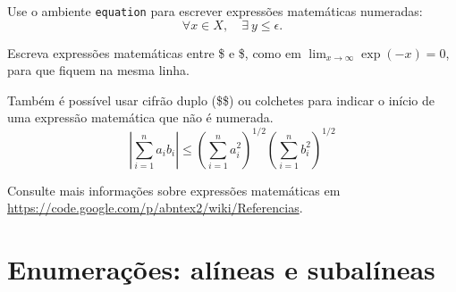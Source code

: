 \documentclass[article,12pt,oneside,a4paper,chapter=TITLE,
			   english,brazil]{abntex2}
\begin{document}
\begin{anexosenv}
Use o ambiente \texttt{equation} para escrever expressões matemáticas numeradas:
\begin{equation}
  \forall x \in X, \quad \exists \: y \leq \epsilon.
\end{equation}

Escreva expressões matemáticas entre \$ e \$, como em $ \lim_{x \to \infty} \exp(-x) = 0 $, para que fiquem na mesma linha.

Também é possível usar cifrão duplo (\$\$) ou colchetes para indicar o início de uma expressão matemática que não é numerada.
$$
\left|\sum_{i=1}^n a_ib_i\right|
\le
\left(\sum_{i=1}^n a_i^2\right)^{1/2}
\left(\sum_{i=1}^n b_i^2\right)^{1/2}
$$

Consulte mais informações sobre expressões matemáticas em \url{https://code.google.com/p/abntex2/wiki/Referencias}.


\section{Enumerações: alíneas e subalíneas}


\end{anexosenv}
\end{document}
